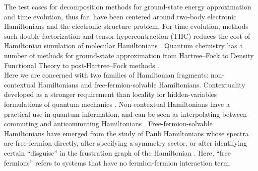 \documentclass[%
 aip,
 amsmath,amssymb,
 reprint,%
]{revtex4-1}
\begin{document}
\indent The test cases for decomposition methods for ground-state energy approximation and time evolution, thus far, have been centered around two-body electronic Hamiltonians and the electronic structure problem. For time evolution, methods such double factorization and tensor hypercontraction (THC) reduces the cost of Hamiltonian simulation of molecular Hamiltonians \cite{WeibeDF, DF2, TroyerDF, necaise2026distributioncomplexityelectronicstructure, hohenstein2012thc, lee2021thc}. Quantum chemistry has a number of methods for ground-state approximation from Hartree--Fock to Density Functional Theory to post-Hartree--Fock methods \cite{Tom_MF1, Tom_MF2, szabo1996modern}. \\
\indent Here we are concerned with two families of Hamiltonian fragments: %
non-contextual Hamiltonians and free-fermion-solvable Hamiltonians. Contextuality developed as a stronger requirement than locality for hidden-variables formulations of quantum mechanics \cite{bell1966Problem, kochen1967Problem, mermin1993Hidden}. %
Non-contextual Hamiltonians have a practical use in quantum information, and can be seen as interpolating between commuting and anticommuting Hamiltonians \cite{La_Cour_Context, Ralli_ContextVQE, Kirby_ContextVQE, Kirby_Contextuality,Kirby_ContextClassic, Raussendorf_MBQC, Weaving_ContextVQE}. Free-fermion-solvable Hamiltonians have emerged from the study of Pauli Hamiltonians whose spectra are free-fermion directly, after specifying a symmetry sector, or after identifying certain \enquote{disguise} in the frustration graph of the Hamiltonian \cite{Chapman_Fermions, fermion_unified, Elman_Fermions, projansky_fermions, Tom_MF1, Tom_MF2, Ruh_2026, ruh2026graphtheoreticanalysisnongenericfreefermion}. Here, ``free fermions'' refers to systems that have no fermion-fermion interaction term.
\end{document}
